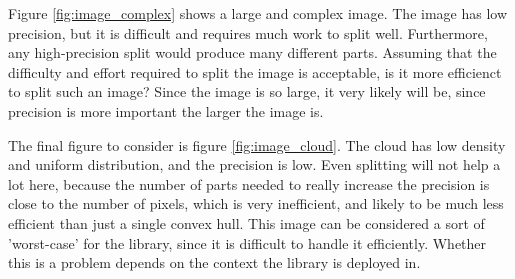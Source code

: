 Figure \ref{fig:image_complex} shows a large and complex image.
The image has low precision, but it is difficult and requires much work
to split well. Furthermore, any high-precision split would produce many
different parts. Assuming that the difficulty and effort required to split
the image is acceptable, is it more efficienct to split such an image?
Since the image is so large, it very likely will be, since precision
is more important the larger the image is.

The final figure to consider is figure \ref{fig:image_cloud}.
The cloud has low density and uniform distribution,
and the precision is low. Even splitting will not help a lot here,
because the number of parts needed to really increase the precision
is close to the number of pixels, which is very inefficient, and likely
to be much less efficient than just a single convex hull.
This image can be considered a sort of 'worst-case' for the library,
since it is difficult to handle it efficiently.
Whether this is a problem depends on the context the library is deployed in.

